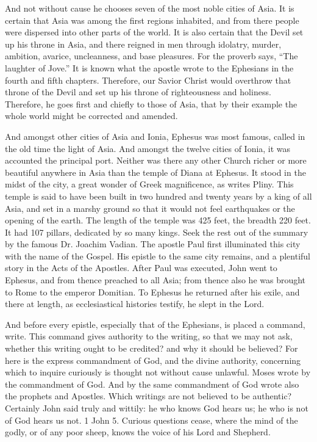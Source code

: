 And not without cause he chooses seven of the most noble cities of Asia. It is certain that Asia was among the first regions inhabited, and from there people were dispersed into other parts of the world. It is also certain that the Devil set up his throne in Asia, and there reigned in men through idolatry, murder, ambition, avarice, uncleanness, and base pleasures. For the proverb says, “The laughter of Jove.” It is known what the apostle wrote to the Ephesians in the fourth and fifth chapters. Therefore, our Savior Christ would overthrow that throne of the Devil and set up his throne of righteousness and holiness. Therefore, he goes first and chiefly to those of Asia, that by their example the whole world might be corrected and amended.

And amongst other cities of Asia and Ionia, Ephesus was most famous, called in the old time the light of Asia. And amongst the twelve cities of Ionia, it was accounted the principal port. Neither was there any other Church richer or more beautiful anywhere in Asia than the temple of Diana at Ephesus. It stood in the midst of the city, a great wonder of Greek magnificence, as writes Pliny. This temple is said to have been built in two hundred and twenty years by a king of all Asia, and set in a marshy ground so that it would not feel earthquakes or the opening of the earth. The length of the temple was 425 feet, the breadth 220 feet. It had 107 pillars, dedicated by so many kings. Seek the rest out of the summary by the famous Dr. Joachim Vadian. The apostle Paul first illuminated this city with the name of the Gospel. His epistle to the same city remains, and a plentiful story in the Acts of the Apostles. After Paul was executed, John went to Ephesus, and from thence preached to all Asia; from thence also he was brought to Rome to the emperor Domitian. To Ephesus he returned after his exile, and there at length, as ecclesiastical histories testify, he slept in the Lord.

And before every epistle, especially that of the Ephesians, is placed a command, write. This command gives authority to the writing, so that we may not ask, whether this writing ought to be credited? and why it should be believed? For here is the express commandment of God, and the divine authority, concerning which to inquire curiously is thought not without cause unlawful. Moses wrote by the commandment of God. And by the same commandment of God wrote also the prophets and Apostles. Which writings are not believed to be authentic? Certainly John said truly and wittily: he who knows God hears us; he who is not of God hears us not. 1 John 5. Curious questions cease, where the mind of the godly, or of any poor sheep, knows the voice of his Lord and Shepherd.

